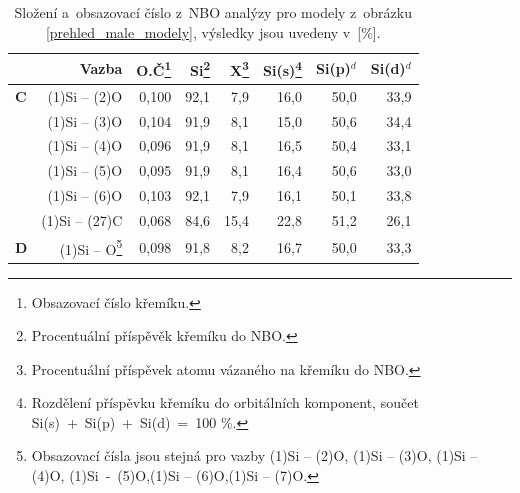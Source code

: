 \documentclass[
digital, %
table,   %
nolof,     %
nolot,     %
oneside,
]{fithesis3}
\begin{document}
\begin{table}[H]
\begin{minipage}{\textwidth}
\caption{Složení a~obsazovací číslo z~NBO analýzy pro modely z~obrázku \ref{prehled_male_modely}, výsledky jsou uvedeny v~[\%].}
\begin{center}
\begin{tabular}{|l|r|r|r|r|r|r|r|}
\hline
\label{nbo_smallII}& Vazba & O.Č\footnote{Obsazovací číslo křemíku.} & Si\footnote{Procentuální příspěvěk křemíku do NBO.} & X\footnote{Procentuální příspěvek atomu vázaného na křemíku do NBO.} & Si(s)\footnote{Rozdělení příspěvku křemíku do orbitálních komponent, součet Si(s)~+~Si(p)~+~Si(d)~=~100 \%.} & Si(p)$^d$ &Si(d)$^d$ \\ \hline
\textbf{C} & (1)Si -- (2)O  & 0,100 & 92,1  & 7,9  & 16,0  & 50,0  & 33,9  \\ \hline
& (1)Si -- (3)O & 0,104 & 91,9  & 8,1  & 15,0  & 50,6  & 34,4  \\ \hline
&  (1)Si -- (4)O& 0,096 & 91,9  & 8,1  & 16,5  & 50,4  & 33,1  \\ \hline
&  (1)Si -- (5)O &0,095 & 91,9  & 8,1  & 16,4  & 50,6  & 33,0  \\ \hline
&  (1)Si -- (6)O & 0,103 & 92,1  & 7,9  & 16,1  & 50,1  & 33,8  \\ \hline
& (1)Si -- (27)C & 0,068 & 84,6  & 15,4  & 22,8  & 51,2  & 26,1  \\ \hline
\textbf{D} & (1)Si -- O\footnote{Obsazovací čísla jsou stejná pro vazby (1)Si -- (2)O, (1)Si -- (3)O, (1)Si -- (4)O, (1)Si~-~(5)O,(1)Si -- (6)O,(1)Si -- (7)O.}  & 0,098 & 91,8  & 8,2  & 16,7  & 50,0  & 33,3  \\ \hline
\end{tabular}
\end{center}
\end{minipage}
\end{table}

\newpage
\end{document}
